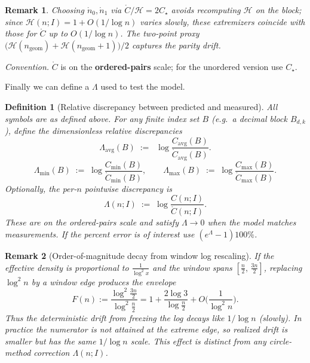 \documentclass[11pt]{article}
\theoremstyle{inline}
\newtheorem*{remark}{Remark}
\theoremstyle{break}
\theoremstyle{break}
\theoremstyle{break}
\theoremstyle{break}
\theoremstyle{break}
\theoremstyle{break}
\theoremstyle{break}
\newtheorem{definition}{Definition}
\theoremstyle{inline}
\newcommand{\tavg}{{\scriptscriptstyle\mathrm{avg}}}
\newcommand{\Cmeas}{C}              %
\newcommand{\Cpred}{\mathring{C}}   %
\newcommand{\Npred}{\mathring{n}}   %
\newcommand{\Ngeom}{n_\mathrm{geom}}
\newcommand{\HLCorr}{\mathcal{H}}
\begin{document}
\begin{remark}
Choosing \(\Npred_0,\Npred_1\) via \(\Cpred/\HLCorr = 2C_\star\) avoids recomputing \(\HLCorr\) on the block; since
\(\HLCorr(n;I)=1+O(1/\log n)\) varies slowly, these extremizers coincide with those for \(\Cpred\) up to \(O(1/\log n)\).
The two-point proxy \(\big(\HLCorr(\Ngeom)+\HLCorr(\Ngeom+1)\big)/2\) captures the parity drift.
\end{remark}

\noindent\emph{Convention.} \(\Cpred\) is on the \textbf{ordered-pairs} scale; for the unordered version use \(C_\star\).

Finally we can define a \( \Lambda \) used to test the model.

\begin{definition}[Relative discrepancy between predicted and measured]
\label{def:lambda}
All symbols are as defined above. For any finite index set \(B\) (e.g.\ a decimal block \(B_{d,k}\)),
define the dimensionless relative discrepancies
\begin{equation}
\Lambda_{\tavg}(B)\;:=\;\;\log{\frac{\Cmeas_{\tavg}(B)}{\Cpred_{\tavg}(B)}}.
\end{equation}
\begin{equation}
\Lambda_{\min}(B)\;:=\;\log{\frac{\Cmeas_{\min}(B)}{\Cpred_{\min}(B)}},
\qquad
\Lambda_{\max}(B)\;:=\;\log{\frac{\Cmeas_{\max}(B)}{\Cpred_{\max}(B)}}.
\end{equation}
Optionally, the per-\(n\) pointwise discrepancy is
\begin{equation}
\Lambda(n;I)\;:=\;\log{\frac{\Cmeas(n;I)}{\Cpred(n;I)}}.
\end{equation}
These are on the ordered-pairs scale and satisfy \(\Lambda\to 0\) when the model matches measurements.
If the percent error is of interest use \( \left( e^{\Lambda} - 1 \right) 100\% \).
\end{definition}

\begin{remark}[Order-of-magnitude decay from window log rescaling]
If the effective density is proportional to \(\frac{1}{\log^2{x}}\) and the window spans
\(\left[\frac{n}{2},\,\frac{3n}{2}\right]\), replacing \(\log^2 n\) by a window edge produces the envelope
\begin{equation}
F(n):=\frac{\log^2{\frac{3n}{2}}}{\log^2{\frac{n}{2}}}
=1+\frac{2\log 3}{\log{\frac{n}{2}}}+O\!\Big(\frac{1}{\log^2 n}\Big).
\end{equation}
Thus the deterministic drift from freezing the log decays like \(1/\log n\) (slowly).
In practice the numerator is not attained at the extreme edge, so realized drift
is smaller but has the same \(1/\log n\) scale. This effect is distinct from any
circle-method correction \(\Lambda(n;I)\).
\end{remark}
\end{document}
